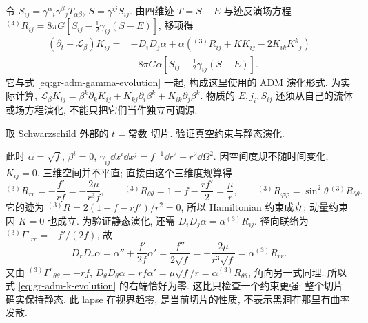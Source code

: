 令 $S_{ij}=\gamma^\alpha{}_i\gamma^\beta{}_jT_{\alpha\beta}$, $S=\gamma^{ij}S_{ij}$. 由四维迹 $T=S-E$ 与迹反演场方程 ${}^{(4)}R_{ij}=8\pi G[S_{ij}-\tfrac12\gamma_{ij}(S-E)]$, 移项得
\begin{equation}
 \begin{split}
 (\partial_t-\mathcal L_\beta)K_{ij}
   ={}&-D_iD_j\alpha
       +\alpha\left({}^{(3)}R_{ij}+KK_{ij}-2K_{ik}K^k{}_j\right)\\
     &-8\pi G\alpha\left[S_{ij}-\frac12\gamma_{ij}(S-E)\right].
 \end{split}
 \label{eq:gr-adm-k-evolution}
\end{equation}
它与式 \eqref{eq:gr-adm-gamma-evolution} 一起, 构成这里使用的 ADM 演化形式. 为实际计算, $\mathcal L_\beta K_{ij}=\beta^k\partial_kK_{ij}+K_{kj}\partial_i\beta^k+K_{ik}\partial_j\beta^k$. 物质的 $E,j_i,S_{ij}$ 还须从自己的流体或场方程演化, 不能只把它们当作独立可调源.


\begin{example}
 取 Schwarzschild 外部的 $t=\text{常数}$ 切片. 验证真空约束与静态演化.
\end{example}
\begin{solution}
 此时 $\alpha=\sqrt f$, $\beta^i=0$, $\gamma_{ij}\dd x^i\dd x^j=f^{-1}\dd r^2+r^2\dd\Omega^2$. 因空间度规不随时间变化, $K_{ij}=0$. 三维空间并不平直; 直接由这个三维度规算得
 \[
 {}^{(3)}R_{rr}=-\frac{f'}{rf}=-\frac{2\mu}{r^3f},\qquad
 {}^{(3)}R_{\theta\theta}=1-f-\frac{rf'}2=\frac\mu r,
 \qquad {}^{(3)}R_{\varphi\varphi}=\sin^2\theta\,{}^{(3)}R_{\theta\theta}.
 \]
 它的迹为 ${}^{(3)}R=2(1-f-rf')/r^2=0$, 所以 Hamiltonian 约束成立; 动量约束因 $K=0$ 也成立. 为验证静态演化, 还需 $D_iD_j\alpha=\alpha{}^{(3)}R_{ij}$. 径向联络为 ${}^{(3)}\Gamma^r{}_{rr}=-f'/(2f)$, 故
 \[
 D_rD_r\alpha=\alpha''+\frac{f'}{2f}\alpha'
            =\frac{f''}{2\sqrt f}
            =-\frac{2\mu}{r^3\sqrt f}=\alpha{}^{(3)}R_{rr}.
 \]
 又由 ${}^{(3)}\Gamma^r{}_{\theta\theta}=-rf$,
 $D_\theta D_\theta\alpha=rf\alpha'=\mu\sqrt f/r=\alpha{}^{(3)}R_{\theta\theta}$, 角向另一式同理. 所以式 \eqref{eq:gr-adm-k-evolution} 的右端恰好为零. 这比只检查一个约束更强: 整个切片确实保持静态. 此 lapse 在视界趋零, 是当前切片的性质, 不表示黑洞在那里有曲率发散.
\end{solution}

